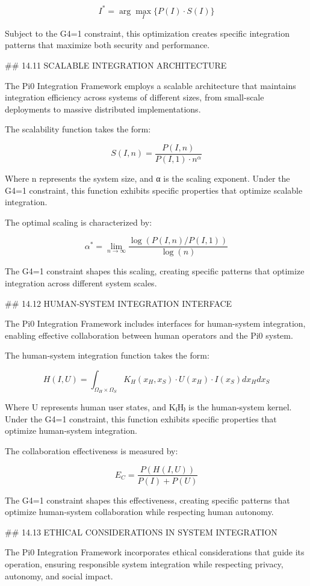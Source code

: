 $$I^* = \arg\max_I \{P(I) \cdot S(I)\}$$

Subject to the G4=1 constraint, this optimization creates specific integration patterns that maximize both security and performance.

## 14.11 SCALABLE INTEGRATION ARCHITECTURE

The Pi0 Integration Framework employs a scalable architecture that maintains integration efficiency across systems of different sizes, from small-scale deployments to massive distributed implementations.

The scalability function takes the form:

$$S(I, n) = \frac{P(I, n)}{P(I, 1) \cdot n^{\alpha}}$$

Where n represents the system size, and α is the scaling exponent. Under the G4=1 constraint, this function exhibits specific properties that optimize scalable integration.

The optimal scaling is characterized by:

$$\alpha^* = \lim_{n \to \infty} \frac{\log(P(I, n)/P(I, 1))}{\log(n)}$$

The G4=1 constraint shapes this scaling, creating specific patterns that optimize integration across different system scales.

## 14.12 HUMAN-SYSTEM INTEGRATION INTERFACE

The Pi0 Integration Framework includes interfaces for human-system integration, enabling effective collaboration between human operators and the Pi0 system.

The human-system integration function takes the form:

$$H(I, U) = \int_{\Omega_H \times \Omega_S} K_H(x_H, x_S) \cdot U(x_H) \cdot I(x_S) dx_H dx_S$$

Where U represents human user states, and K₍H₎ is the human-system kernel. Under the G4=1 constraint, this function exhibits specific properties that optimize human-system integration.

The collaboration effectiveness is measured by:

$$E_C = \frac{P(H(I, U))}{P(I) + P(U)}$$

The G4=1 constraint shapes this effectiveness, creating specific patterns that optimize human-system collaboration while respecting human autonomy.

## 14.13 ETHICAL CONSIDERATIONS IN SYSTEM INTEGRATION

The Pi0 Integration Framework incorporates ethical considerations that guide its operation, ensuring responsible system integration while respecting privacy, autonomy, and social impact.

